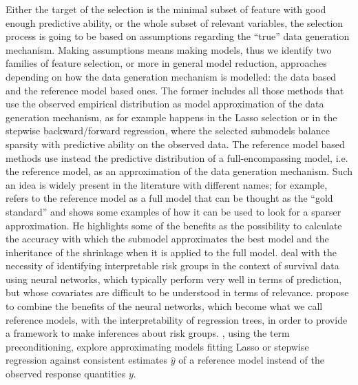 \documentclass[american,]{article}
\theoremstyle{definition}
\begin{document}
Either the target of the selection is the minimal subset of feature with good enough predictive ability, or the whole subset of relevant variables, the selection process is going to be based on assumptions regarding the ``true'' data generation mechanism. Making assumptions means making models, thus we identify two families of feature selection, or more in general model reduction, approaches depending on how the data generation mechanism is modelled: the data based and the reference model based ones. The former includes all those methods that use the observed empirical distribution as model approximation of the data generation mechanism, as for example happens in the Lasso selection \cite{tibshirani1996regression} or in the stepwise backward/forward regression, where the selected submodels balance sparsity with predictive ability on the observed data. The reference model based methods use instead the predictive distribution of a full-encompassing model, i.e. the reference model, as an approximation of the data generation mechanism. Such an idea is widely present in the literature with different names; for example, \cite{harrell2015regression} refers to the reference model as a full model that can be thought as the ``gold standard'' and shows some examples of how it can be used to look for a sparser approximation. He highlights some of the benefits as the possibility to calculate the accuracy with which the submodel approximates the best model and the inheritance of the shrinkage when it is applied to the full model. \cite{faraggi2001understanding} deal with the necessity of identifying interpretable risk groups in the context of survival data using neural networks, which typically perform very well in terms of prediction, but whose covariates are difficult to be understood in terms of relevance. \cite{faraggi2001understanding} propose to combine the benefits of the neural networks, which become what we call reference models, with the interpretability of regression trees, in order to provide a framework to make inferences about risk groups. \cite{paul2008preconditioning}, using the term preconditioning, explore approximating models fitting Lasso or stepwise regression against consistent estimates $\hat{y}$ of a reference model instead of the observed response quantities $y$. 
\\
\end{document}
